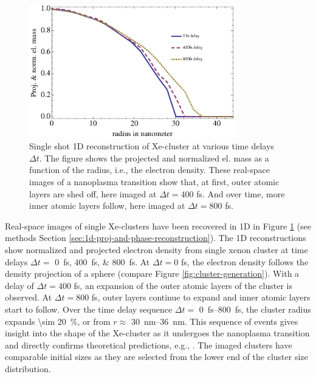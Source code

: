 \begin{figure}
	\centering
		\includegraphics[width=0.80\textwidth]{images/results/Xe-reconstructions.eps}
	\caption[Single-shot 1D reconstruction of \SI{\sim 30}{\nano\meter} radius Xe-cluster]{Single shot 1D reconstruction of Xe-cluster at various time delays $\Delta t$. The figure shows the projected and normalized el. mass as a function of the radius, i.e., the electron density. These real-space images of a nanoplasma transition show that, at first, outer atomic layers are shed off, here imaged at $\Delta t=400$ fs. And over time, more inner atomic layers follow, here imaged at $\Delta t= 800$ fs.}
	\label{fig:Xe-reconstructions}
\end{figure}
Real-space images of single Xe-clusters have been recovered in 1D in Figure \ref{fig:Xe-reconstructions} (see methods Section \ref{sec:1d-proj-and-phase-reconstruction}). The 1D reconstructions show normalized and projected electron density from single xenon cluster at time delays $\Delta t=$ \SIlist{0;400;800}{\femto\second}. At $\Delta t = 0$ fs, the electron density follows the density projection of a sphere (compare Figure \ref{fig:cluster-generation}). With a delay of $\Delta t = 400$ fs, an expansion of the outer atomic layers of the cluster is observed. At $\Delta t = 800$ fs, outer layers continue to expand and inner atomic layers start to follow. Over the time delay sequence $\Delta t=$ \SIrange{0}{800}{\femto\second}, the cluster radius expands \SI{\sim 20}{\percent}, or from $r\approx $ \SIrange{30}{36}{\nano\meter}. This sequence of events gives insight into the shape of the Xe-cluster as it undergoes the nanoplasma transition and directly confirms theoretical predictions, e.g., \citep{Hau-Riege-2004-PRE}. The imaged clusters have comparable initial sizes as they are selected from the lower end of the cluster size distribution.\\[1\baselineskip]
